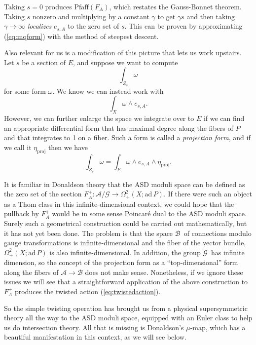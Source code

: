 \documentclass[twoside]{amsart}
\renewcommand{\eqref}[1]{(\ref{eq:#1})}
\newcommand{\enm}[1]{\ensuremath{#1}}
\renewcommand{\aa}{\enm{\mathcal{A}}}
\newcommand{\bb}{\enm{\mathcal{B}}}
\renewcommand{\gg}{\enm{\mathcal{G}}}
\newcommand{\ad}{\enm{\mathrm{ad}}}
\newcommand{\adp}{\enm{\ad\,P}}
\begin{document}
Taking \( s=0 \) produces \( \mathrm{Pfaff}(F_{A}) \), which restates
the Gauss-Bonnet theorem.  Taking \( s \) nonzero and multiplying by a
constant \( \gamma \) to get \( \gamma s \) and then taking \(
\gamma\to\infty \) \emph{localizes} \( e_{s,A} \) to the zero set of
\( s \).  This can be proven by approximating \eqref{mqform} with the
method of steepest descent.

Also relevant for us is a modification of this picture that lets us
work upstairs.  Let \( s \) be a section of \( E \), and suppose we
want to compute
\[ \int_{Z_{s}}\omega \]
for some form \( \omega \).  We know we can instead work with
\[ \int_{X}\omega\wedge e_{s, A}. \]
However, we can further enlarge the space we integrate over to \( E \)
if we can find an appropriate differential form that has maximal degree
along the
fibers of \( P \) and that integrates to 1 on a fiber.  Such a form is
called a
\emph{projection form}, and if we call it \( \eta_{\mathrm{proj}} \)
then we have
\[ \int_{Z_{s}}\omega = \int_{E}\omega\wedge e_{s,A}\wedge
\eta_{\mathrm{proj}}. \]

It is familiar in Donaldson theory that the
ASD moduli space can be defined as the zero set of
the section \( F_{A}^{+}:\aa/\gg\to \Omega^{2}_{+}(X; \adp).  \) If
there were such an object as a Thom class in this infinite-dimensional
context, we could hope that the pullback by \( F_{A}^{+} \) would be
in some sense Poincar\'e dual to the ASD moduli space.  Surely such a
geometrical construction could be carried out mathematically, but it has
not yet been done.  The problem is that the space \bb\ of connections
modulo gauge transformations is infinite-dimensional and the fiber of
the vector bundle, \( \Omega^{2}_{+}(X; \adp) \) is also
infinite-dimensional.  In addition, the group \gg\ has infinite
dimension, so the concept of the projection form as a
``top-dimensional'' form along the fibers of \( \aa\to\bb \) does not
make sense.  Nonetheless, if we ignore these issues we will see that a
straightforward application of the above construction to \( F_{A}^{+} \)
produces the twisted action \eqref{twistedaction}.

So the simple twisting operation has brought us from a physical
supersymmetric theory all the way to the ASD moduli space, equipped
with an Euler class to help us do intersection theory.  All that is
missing is Donaldson's \( \mu \)-map, which has a beautiful
manifestation in this context, as we will see below.
\end{document}
